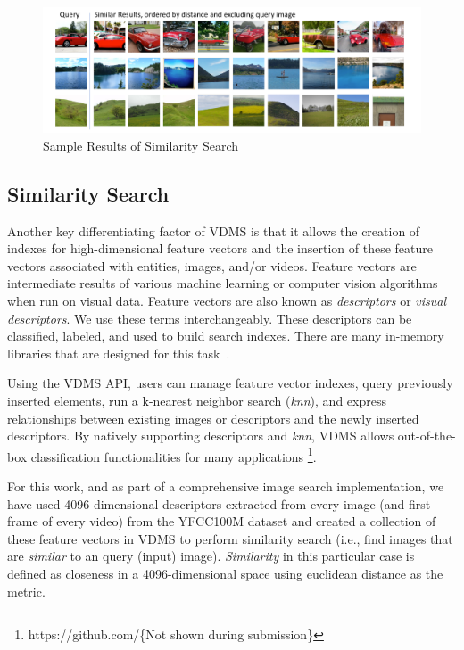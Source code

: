 
\begin{figure}[ht!]
\centering
\includegraphics[width=\textwidth]{figures/feature_img_results}
\caption{Sample Results of Similarity Search}
\label{fig:similarity}
\end{figure}

\subsection{Similarity Search}
\label{features}

Another key differentiating factor of VDMS is that it allows the creation of
indexes for high-dimensional feature vectors and the insertion of
these feature vectors associated with entities, images, and/or videos.
Feature vectors are intermediate results of various machine
learning or computer vision algorithms when run on visual data.
Feature vectors are also known as \textit{descriptors}
or \textit{visual descriptors}. We use these terms interchangeably.
These descriptors can be classified, labeled, and used to build search
indexes. There are many in-memory libraries that are designed for
this task~\cite{flann, faiss}.


Using the VDMS API, users can manage feature vector indexes,
query previously inserted elements,
run a k-nearest neighbor search (\textit{knn}), and express relationships
between existing images or descriptors and
the newly inserted descriptors.
By natively supporting descriptors and \textit{knn},
VDMS allows out-of-the-box classification functionalities for many applications
\footnote{https://github.com/\{Not shown during submission\}}.

For this work, and as part of a comprehensive image search implementation,
we have used 4096-dimensional descriptors extracted from every image
(and first frame of every video) from the YFCC100M dataset
and created a collection of these feature vectors in VDMS to
perform similarity search (i.e., find images that are
\textit{similar} to an query (input) image).
\textit{Similarity} in this particular case is defined as closeness
in a 4096-dimensional space using euclidean distance as the metric.

